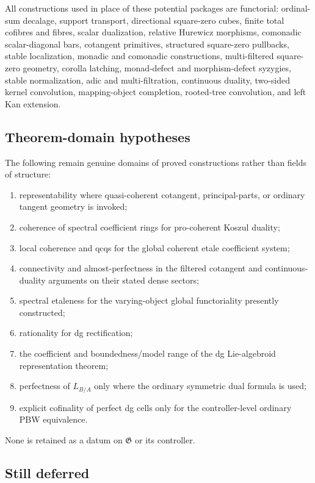 All constructions used in place of these potential packages are functorial:
ordinal-sum decalage, support transport, directional square-zero cubes, finite
total cofibres and fibres, scalar dualization, relative Hurewicz morphisms,
comonadic scalar-diagonal bars, cotangent primitives, structured square-zero
pullbacks, stable localization, monadic and comonadic constructions,
multi-filtered square-zero geometry, corolla latching, monad-defect and
morphism-defect syzygies, stable normalization, adic and multi-filtration,
continuous duality, two-sided kernel convolution, mapping-object completion,
rooted-tree convolution, and left Kan extension.

\subsection{Theorem-domain hypotheses}

The following remain genuine domains of proved constructions rather than
fields of structure:
\begin{enumerate}
    \item representability where quasi-coherent cotangent,
    principal-parts, or ordinary tangent geometry is invoked;
    \item coherence of spectral coefficient rings for pro-coherent Koszul
    duality;
    \item local coherence and qcqs for the global coherent etale coefficient
    system;
    \item connectivity and almost-perfectness in the filtered cotangent and
    continuous-duality arguments on their stated dense sectors;
    \item spectral etaleness for the varying-object global functoriality
    presently constructed;
    \item rationality for dg rectification;
    \item the coefficient and boundedness/model range of the dg
    Lie-algebroid representation theorem;
    \item perfectness of $L_{B/A}$ only where the ordinary symmetric dual
    formula is used;
    \item explicit cofinality of perfect dg cells only for the
    controller-level ordinary PBW equivalence.
\end{enumerate}
None is retained as a datum on $\mathfrak G$ or its controller.

\subsection{Still deferred}

